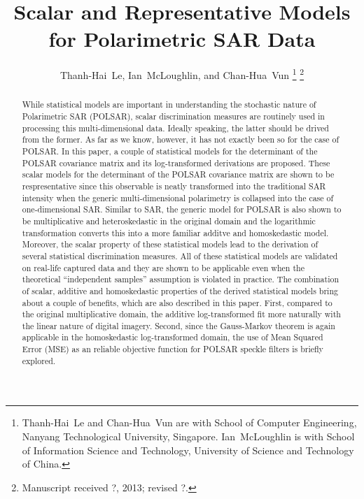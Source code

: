 \documentclass[journal]{IEEEtran}
\title{
  Scalar and Representative Models for Polarimetric SAR Data
}
\author{Thanh-Hai~Le,
        Ian~McLoughlin, 
	and Chan-Hua~Vun%
\thanks{Thanh-Hai~Le and Chan-Hua~Vun are with School of Computer Engineering, 
Nanyang Technological University, Singapore. Ian~McLoughlin is with School of Information Science and Technology,
University of Science and Technology of China.
}%
\thanks{Manuscript received ?, 2013; revised ?.}}
\begin{document}
\maketitle

\begin{abstract}
  While statistical models are important in understanding the stochastic nature of Polarimetric SAR (POLSAR),
  scalar discrimination measures are routinely used in processing this multi-dimensional data.
  Ideally speaking, the latter should be drived from the former.
  As far as we know, however, it has not exactly been so for the case of POLSAR.
  In this paper, a couple of statistical models for the determinant of the POLSAR covariance matrix and its log-transformed derivations are proposed.
  These scalar models for the determinant of the POLSAR covariance matrix are shown to be respresentative
    since this observable is neatly transformed into the traditional SAR intensity
    when the generic multi-dimensional polarimetry is collapsed into the case of one-dimensional SAR. %
  Similar to SAR, the generic model for POLSAR is also shown to be multiplicative and heteroskedastic in the original domain 
    and the logarithmic transformation converts this into a more familiar additve and homoskedastic model.
  Moreover, the scalar property of these statistical models lead to the derivation of several statistical discrimination measures. %
  All of these statistical models are validated on real-life captured data
    and they are shown to be applicable even when the theoretical ``independent samples'' assumption is violated in practice.
  The combination of scalar, additive and homoskedastic properties of the derived statistical models bring about a couple of benefits, which are also described in this paper.
  First, compared to the original multiplicative domain, %
    the additive log-transformed fit more naturally with the linear nature of digital imagery.
  Second, since the Gauss-Markov theorem is again applicable in the homoskedastic log-transformed domain,
    the use of Mean Squared Error (MSE) as an reliable objective function for POLSAR speckle filters is briefly explored.

\end{abstract}
\end{document}
